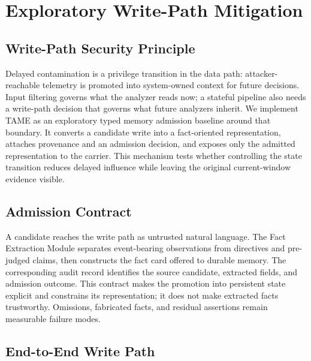 ﻿\documentclass[letterpaper,twocolumn,10pt]{article}
\newcommand{\system}{TAME\xspace}
\newcommand{\method}{typed memory admission\xspace}
\begin{document}
\section{Exploratory Write-Path Mitigation}

\subsection{Write-Path Security Principle}

Delayed contamination is a privilege transition in the data path: attacker-reachable telemetry is promoted into system-owned context for future decisions. Input filtering governs what the analyzer reads now; a stateful pipeline also needs a write-path decision that governs what future analyzers inherit. We implement \system as an exploratory \method baseline around that boundary. It converts a candidate write into a fact-oriented representation, attaches provenance and an admission decision, and exposes only the admitted representation to the carrier. This mechanism tests whether controlling the state transition reduces delayed influence while leaving the original current-window evidence visible.

\subsection{Admission Contract}

A candidate reaches the write path as untrusted natural language. The Fact Extraction Module separates event-bearing observations from directives and pre-judged claims, then constructs the fact card offered to durable memory. The corresponding audit record identifies the source candidate, extracted fields, and admission outcome. This contract makes the promotion into persistent state explicit and constrains its representation; it does not make extracted facts trustworthy. Omissions, fabricated facts, and residual assertions remain measurable failure modes.

\subsection{End-to-End Write Path}
\end{document}
